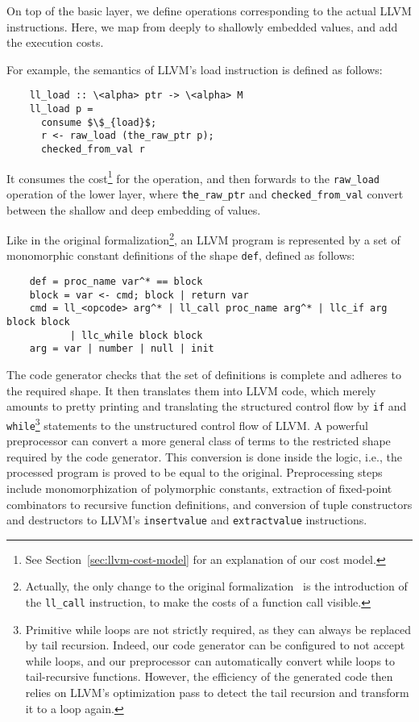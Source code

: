 \documentclass[acmsmall]{acmart}
\newcommand{\is}{\lstinline[language=isabelle]}
\begin{document}
On top of the basic layer, we define operations corresponding to the actual LLVM instructions. Here, we map from deeply to shallowly embedded values, and add the execution costs. 

For example, the semantics of LLVM's load instruction is defined as follows:
\begin{lstlisting}
    ll_load :: \<alpha> ptr -> \<alpha> M 
    ll_load p =
      consume $\$_{load}$;
      r <- raw_load (the_raw_ptr p);
      checked_from_val r
\end{lstlisting}
It consumes the cost\footnote{See Section~\ref{sec:llvm-cost-model} for an explanation of our cost model.} for the operation, and then forwards to the \is{raw_load} operation of the lower layer, where \is{the_raw_ptr} and \is{checked_from_val} convert between the shallow and deep embedding of values.


Like in the original formalization\footnote{Actually, the only change to the original formalization~\cite{lammich2019LLVM} is the introduction of the \is{ll_call} instruction, to make the costs of a function call visible.}, an LLVM program is represented by a set
of monomorphic constant definitions of the shape \is{def}, defined as follows:
\begin{lstlisting}
    def = proc_name var^* == block
    block = var <- cmd; block | return var
    cmd = ll_<opcode> arg^* | ll_call proc_name arg^* | llc_if arg block block 
           | llc_while block block
    arg = var | number | null | init
\end{lstlisting}
The code generator checks that the set of definitions is complete and adheres to the required shape. It then translates them into LLVM code, which merely amounts to pretty printing and translating the structured control flow by \is{if} and \is{while}\footnote{Primitive while loops are not strictly required, as they can always be replaced by tail recursion. Indeed, our code generator can be configured to not accept while loops, and our preprocessor can automatically convert while loops to tail-recursive functions. However, the efficiency of the generated code then relies on LLVM's optimization pass to detect the tail recursion and transform it to a loop again.} statements to the unstructured control flow of LLVM. A powerful preprocessor can convert a more general class of terms to the restricted shape required by the code generator. This conversion is done inside the logic, i.e., the processed program is proved to be equal to the original. Preprocessing steps include monomorphization of polymorphic constants, extraction of fixed-point combinators to recursive function definitions, and conversion of tuple constructors and destructors to LLVM's \is{insertvalue} and \is{extractvalue} instructions.
\end{document}
